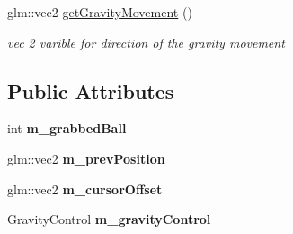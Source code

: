 \begin{DoxyCompactItemize}
\item 
\hypertarget{classBallControl_a6eb0d955ccad645cd5d8865c3bd899a7}{
glm::vec2 \hyperlink{classBallControl_a6eb0d955ccad645cd5d8865c3bd899a7}{getGravityMovement} ()}
\label{classBallControl_a6eb0d955ccad645cd5d8865c3bd899a7}

\begin{DoxyCompactList}\small\item\em vec 2 varible for direction of the gravity movement \item\end{DoxyCompactList}\end{DoxyCompactItemize}
\subsection*{Public Attributes}
\begin{DoxyCompactItemize}
\item 
\hypertarget{classBallControl_ac64a1d833bcd49fa9ab2ebcce3995be6}{
int {\bfseries m\_\-grabbedBall}}
\label{classBallControl_ac64a1d833bcd49fa9ab2ebcce3995be6}

\item 
\hypertarget{classBallControl_a49b276d3d47c744915e289985b54ae4e}{
glm::vec2 {\bfseries m\_\-prevPosition}}
\label{classBallControl_a49b276d3d47c744915e289985b54ae4e}

\item 
\hypertarget{classBallControl_abe4695134fe9cfabef70ed8620de37d2}{
glm::vec2 {\bfseries m\_\-cursorOffset}}
\label{classBallControl_abe4695134fe9cfabef70ed8620de37d2}

\item 
\hypertarget{classBallControl_a64337536a5959b08a7f0b5cb9af52691}{
GravityControl {\bfseries m\_\-gravityControl}}
\label{classBallControl_a64337536a5959b08a7f0b5cb9af52691}

\end{DoxyCompactItemize}


